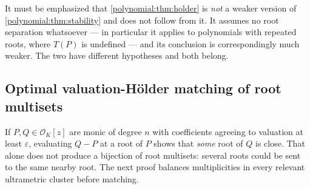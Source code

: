 \documentclass[11pt,letterpaper]{article}
\numberwithin{equation}{section}
\theoremstyle{definition}
\theoremstyle{remark}\newtheorem{remark}[theorem]{Remark}
\newcommand{\OO}{\mathcal O}
\begin{document}
\noindent
It must be emphasized that \cref{polynomial:thm:holder} is \emph{not} a weaker
version of \cref{polynomial:thm:stability} and does not follow from it. It
assumes no root separation whatsoever --- in particular it applies to
polynomials with repeated roots, where $T(P)$ is undefined --- and its
conclusion is correspondingly much weaker. The two have different hypotheses
and both belong.

\subsection{Optimal valuation-H\"older matching of root multisets}
If $P,Q\in\OO_K[z]$ are monic of degree $n$ with coefficients agreeing to
valuation at least $\varepsilon$, evaluating $Q-P$ at a root of $P$ shows that
\emph{some} root of $Q$ is close. That alone does not produce a bijection of
root multisets: several roots could be sent to the same nearby root. The next
proof balances multiplicities in every relevant ultrametric cluster before
matching.
\end{document}
